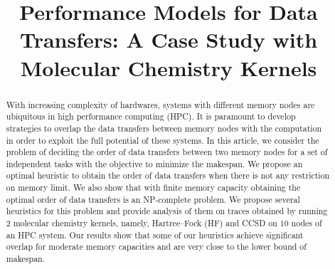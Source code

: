\documentclass[runningheads]{llncs} %
\begin{document}
	\title{Performance Models for Data Transfers: A Case Study with Molecular Chemistry Kernels}
	\author{}
	\maketitle              %
	\begin{abstract} 

With increasing complexity of hardwares, systems with different memory nodes are ubiquitous in high performance computing (HPC). It is paramount to develop strategies to overlap the data transfers between memory nodes with the computation in order to exploit the full potential of these systems. In this article, we consider the problem of deciding the  order of data transfers between two memory nodes for a set of independent tasks  with the objective to minimize the makespan. We propose an optimal heuristic to obtain the order of data transfers when there is not any restriction on memory limit. We also show that with finite memory capacity obtaining the optimal order of data transfers is an NP-complete problem. We propose several heuristics for this problem and provide analysis of them on traces obtained by running 2 molecular chemistry kernels, namely, Hartree–Fock (HF)  and CCSD on 10 nodes of an HPC system. Our results show that some of our heuristics achieve significant overlap for moderate memory capacities and are very close to the lower bound of makespan.

	\end{abstract} %
\end{document}
